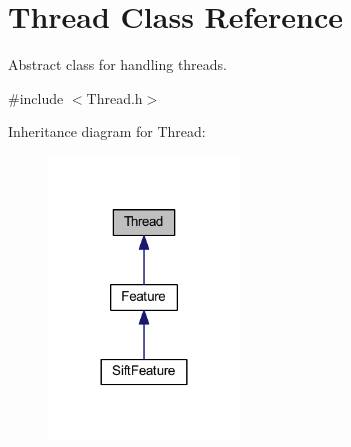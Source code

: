\hypertarget{class_thread}{\section{Thread Class Reference}
\label{class_thread}
}


Abstract class for handling threads.  




{\ttfamily \#include $<$Thread.\-h$>$}



Inheritance diagram for Thread\-:
\nopagebreak
\begin{figure}[H]
\begin{center}
\leavevmode
\includegraphics[width=144pt]{class_thread__inherit__graph}
\end{center}
\end{figure}
